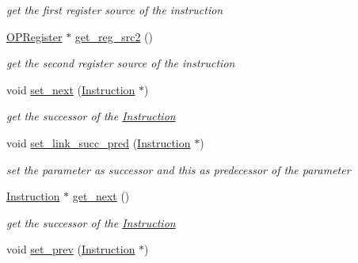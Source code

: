\begin{DoxyCompactItemize}
\begin{DoxyCompactList}\small\item\em get the first register source of the instruction \end{DoxyCompactList}\item 
\hypertarget{class_instruction_a0eb007b1b0a038610e71a58af3bb6438}{\hyperlink{class_o_p_register}{O\-P\-Register} $\ast$ \hyperlink{class_instruction_a0eb007b1b0a038610e71a58af3bb6438}{get\-\_\-reg\-\_\-src2} ()}\label{class_instruction_a0eb007b1b0a038610e71a58af3bb6438}

\begin{DoxyCompactList}\small\item\em get the second register source of the instruction \end{DoxyCompactList}\item 
\hypertarget{class_instruction_a2fb436e52a0cc89e7ec08bf0e105bba3}{void \hyperlink{class_instruction_a2fb436e52a0cc89e7ec08bf0e105bba3}{set\-\_\-next} (\hyperlink{class_instruction}{Instruction} $\ast$)}\label{class_instruction_a2fb436e52a0cc89e7ec08bf0e105bba3}

\begin{DoxyCompactList}\small\item\em get the successor of the \hyperlink{class_instruction}{Instruction} \end{DoxyCompactList}\item 
\hypertarget{class_instruction_ab8f6e21bc94df2198678a3cdbcfaa12e}{void \hyperlink{class_instruction_ab8f6e21bc94df2198678a3cdbcfaa12e}{set\-\_\-link\-\_\-succ\-\_\-pred} (\hyperlink{class_instruction}{Instruction} $\ast$)}\label{class_instruction_ab8f6e21bc94df2198678a3cdbcfaa12e}

\begin{DoxyCompactList}\small\item\em set the parameter as successor and this as predecessor of the parameter \end{DoxyCompactList}\item 
\hypertarget{class_instruction_a93d5d6186afcf358c5a21f4c57a0d72e}{\hyperlink{class_instruction}{Instruction} $\ast$ \hyperlink{class_instruction_a93d5d6186afcf358c5a21f4c57a0d72e}{get\-\_\-next} ()}\label{class_instruction_a93d5d6186afcf358c5a21f4c57a0d72e}

\begin{DoxyCompactList}\small\item\em get the successor of the \hyperlink{class_instruction}{Instruction} \end{DoxyCompactList}\item 
\hypertarget{class_instruction_a69d2992a0eb1fbe5fb6a38b52e13a804}{void \hyperlink{class_instruction_a69d2992a0eb1fbe5fb6a38b52e13a804}{set\-\_\-prev} (\hyperlink{class_instruction}{Instruction} $\ast$)}\label{class_instruction_a69d2992a0eb1fbe5fb6a38b52e13a804}


\end{DoxyCompactItemize}
